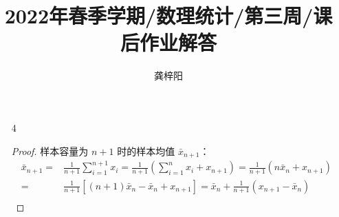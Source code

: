 \documentclass[normal,cn]{elegantnote}
\title{2022年春季学期/数理统计/第三周/课后作业解答}
\author{龚梓阳}
\date{\zhtoday}
\begin{document}
\maketitle
\begin{enumerate}
    \item[4]
        \begin{proof}
            样本容量为 $n+1$ 时的样本均值 $\bar{x}_{n+1}$：
            \begin{equation*}
                \begin{aligned}
                    \bar{x}_{n+1}= & \frac{1}{n+1}\sum_{i=1}^{n+1}x_i=\frac{1}{n+1}\left(\sum_{i=1}^nx_i+x_{n+1}\right)=\frac{1}{n+1}\left(n\bar{x}_n+x_{n+1}\right) \\
                    =              & \frac{1}{n+1}[\left(n+1\right)\bar{x}_n-\bar{x}_n+x_{n+1}]=\bar{x}_n+\frac{1}{n+1}\left(x_{n+1}-\bar{x}_n\right)                \\
                \end{aligned}
            \end{equation*}


\end{proof}
\end{enumerate}
\end{document}
